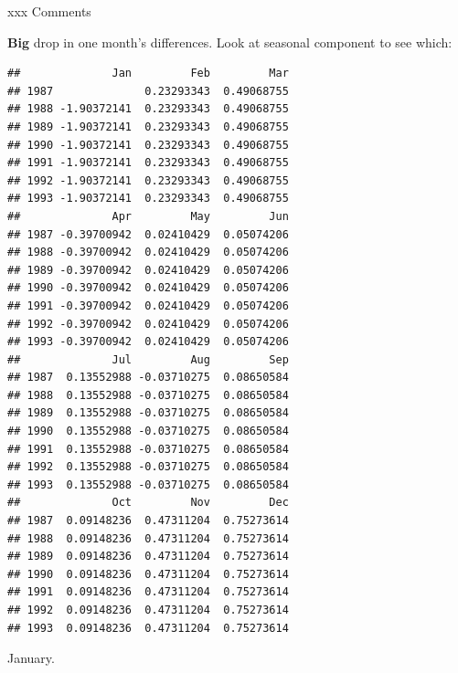 \documentclass[ignorenonframetext,]{beamer}
\newenvironment{Shaded}{\begin{snugshade}}{\end{snugshade}}
\newcommand{\NormalTok}[1]{#1}
\newcommand{\OperatorTok}[1]{\textcolor[rgb]{0.81,0.36,0.00}{\textbf{#1}}}
\begin{document}
\begin{frame}[fragile]{xxx Comments}
\protect\hypertarget{xxx-comments}{}

\textbf{Big} drop in one month's differences. Look at seasonal component
to see which:

\tiny

\begin{Shaded}
\end{Shaded}

\begin{verbatim}
##              Jan         Feb         Mar
## 1987              0.23293343  0.49068755
## 1988 -1.90372141  0.23293343  0.49068755
## 1989 -1.90372141  0.23293343  0.49068755
## 1990 -1.90372141  0.23293343  0.49068755
## 1991 -1.90372141  0.23293343  0.49068755
## 1992 -1.90372141  0.23293343  0.49068755
## 1993 -1.90372141  0.23293343  0.49068755
##              Apr         May         Jun
## 1987 -0.39700942  0.02410429  0.05074206
## 1988 -0.39700942  0.02410429  0.05074206
## 1989 -0.39700942  0.02410429  0.05074206
## 1990 -0.39700942  0.02410429  0.05074206
## 1991 -0.39700942  0.02410429  0.05074206
## 1992 -0.39700942  0.02410429  0.05074206
## 1993 -0.39700942  0.02410429  0.05074206
##              Jul         Aug         Sep
## 1987  0.13552988 -0.03710275  0.08650584
## 1988  0.13552988 -0.03710275  0.08650584
## 1989  0.13552988 -0.03710275  0.08650584
## 1990  0.13552988 -0.03710275  0.08650584
## 1991  0.13552988 -0.03710275  0.08650584
## 1992  0.13552988 -0.03710275  0.08650584
## 1993  0.13552988 -0.03710275  0.08650584
##              Oct         Nov         Dec
## 1987  0.09148236  0.47311204  0.75273614
## 1988  0.09148236  0.47311204  0.75273614
## 1989  0.09148236  0.47311204  0.75273614
## 1990  0.09148236  0.47311204  0.75273614
## 1991  0.09148236  0.47311204  0.75273614
## 1992  0.09148236  0.47311204  0.75273614
## 1993  0.09148236  0.47311204  0.75273614
\end{verbatim}

\normalsize

January.

\end{frame}
\end{document}
